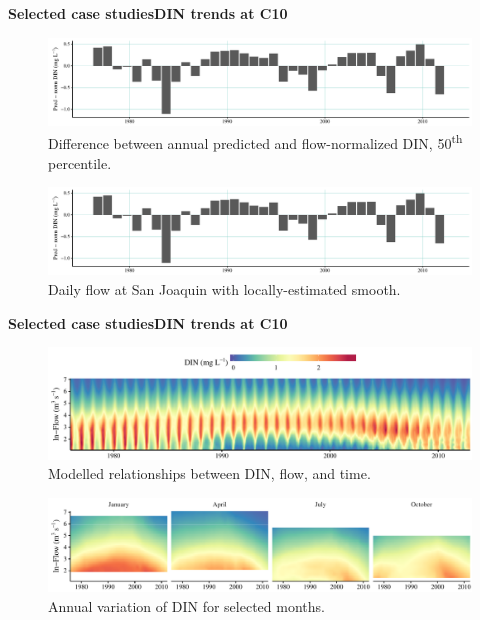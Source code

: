 \documentclass[serif]{beamer}\usepackage[]{graphicx}\usepackage[]{color}
\begin{document}
\begin{frame}[t]{\textbf{Selected case studies}}{\textbf{DIN trends at C10}}
\onslide<+->
\begin{figure}
\centerline{\includegraphics[width = \textwidth, page = 1]{fig/c10flow.pdf}}
\caption{Difference between annual predicted and flow-normalized DIN, 50\textsuperscript{th} percentile.}
\end{figure}
\vspace{-0.2in}
\onslide<+->
\begin{figure}
\centerline{\includegraphics[width = \textwidth, page = 2]{fig/c10flow.pdf}}
\caption{Daily flow at San Joaquin with locally-estimated smooth.}
\end{figure}
\end{frame}



\begin{frame}[t]{\textbf{Selected case studies}}{\textbf{DIN trends at C10}}
\onslide<+->
\vspace{-0.1in}
\begin{figure}
\centerline{\includegraphics[width = \textwidth]{fig/c10grd1.pdf}}
\caption{Modelled relationships between DIN, flow, and time.}
\end{figure}
\vspace{-0.3in}
\onslide<+->
\begin{figure}
\centerline{\includegraphics[width = \textwidth]{fig/c10grd2.pdf}}
\caption{Annual variation of DIN for selected months.}
\end{figure}
\end{frame}
\end{document}
